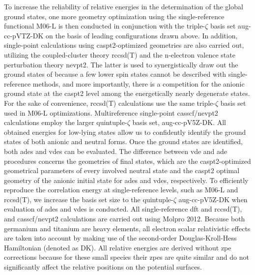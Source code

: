 \begin{refsection}
To increase the reliability of relative energies in the determination of the global ground states, one more geometry optimization using the single-reference functional M06-L is then conducted in conjunction with the triple-$\zeta$ basis set aug-cc-pVTZ-DK on the basis of leading configurations drawn above. In addition, single-point calculations using \acrshort{caspt2}-optimized geometries are also carried out, utilizing the coupled-cluster theory \acrshort{rccsd}(T) and the n-electron valence state perturbation theory \acrshort{nevpt2}. The latter is used to synergistically draw out the ground states of  because a few lower spin states cannot be described with single-reference methods, and more importantly, there is a competition for the anionic ground state at the \acrshort{caspt2} level among the energetically nearly degenerate states. For the sake of convenience, \acrshort{rccsd}(T) calculations use the same triple-$\zeta$ basis set used in M06-L optimizations. Multireference single-point \acrshort{casscf}/\acrshort{nevpt2} \cite{c4:34} calculations employ the larger quintuple-$\zeta$ basis set, aug-cc-pV5Z-DK. All obtained energies for low-lying states allow us to confidently identify the ground states of both anionic and neutral forms. Once the ground states are identified, both \acrshort{ade}s and \acrshort{vde}s can be evaluated. The difference between \acrshort{vde} and \acrshort{ade} procedures concerns the geometries of final states, which are the \acrshort{caspt2}-optimized geometrical parameters of every involved neutral state and the \acrshort{caspt2} optimal geometry of the anionic initial state for \acrshort{ade}s and \acrshort{vde}s, respectively. To efficiently reproduce the correlation energy at single-reference levels, such as M06-L and \acrshort{rccsd}(T), we increase the basis set size to the quintuple-$\zeta$ aug-cc-pV5Z-DK when evaluation of \acrshort{ade}s and \acrshort{vde}s is conducted. All single-reference \acrshort{dft} and \acrshort{rccsd}(T), and \acrshort{casscf}/\acrshort{nevpt2} calculations are carried out using Molpro 2012. \cite{c4:35} Because both germanium and titanium are heavy elements, all electron scalar relativistic effects are taken into account by making use of the second-order Douglas-Kroll-Hess Hamiltonian (denoted as DK). \cite{c4:36} All relative energies are derived without \acrshort{zpe} corrections because for these small species their \acrshort{zpe}s are quite similar and do not significantly affect the relative positions on the potential surfaces. \cite{c4:37}






\end{refsection}
